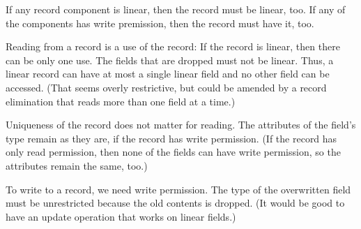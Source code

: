 \documentclass{llncs}
\begin{document}
\newpage
If any record component is linear, then the record must be linear, too.
If any of the components has write premission, then the record must have it, too.
\begin{mathpar}
\end{mathpar}
Reading from a record is a use of the record: If the record is linear, then there can be only one use. The fields that are dropped  must not be linear. Thus, a linear record can have at most a single linear field and no other field can be accessed. (That seems overly restrictive, but could be amended by a record elimination that reads more than one field at a time.) 

Uniqueness of the record does not matter for reading. The attributes of the field's type remain as they are, if the record has write permission. (If the record has only read permission, then none of the fields can have write permission, so the attributes remain the same, too.)
\begin{mathpar}
\end{mathpar}
To write to a record, we need write permission. The type of the overwritten field must be unrestricted because the old contents is dropped. (It would be good to have an update operation that works on linear fields.)
\begin{mathpar}
\end{mathpar}
\end{document}
